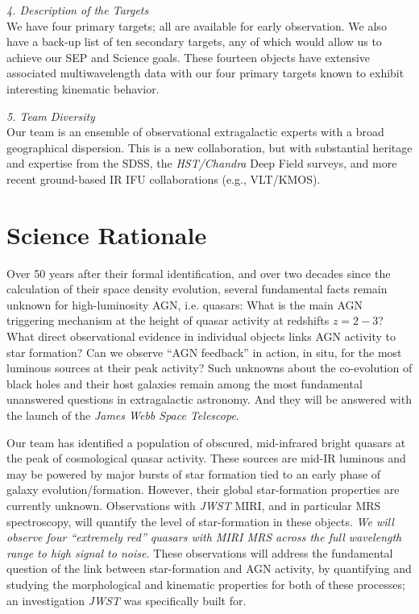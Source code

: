 \smallskip 
\smallskip \smallskip
\noindent
{\it 4. Description of the Targets}\\
We have four primary targets; all are available for early observation.
We also have a back-up list of ten secondary targets, any of which
would allow us to achieve our SEP and Science goals. These fourteen
objects have extensive associated multiwavelength data with our four
primary targets known to exhibit interesting kinematic behavior.

\smallskip 
\smallskip \smallskip
\noindent
{\it 5. Team Diversity}\\
Our team is an ensemble of observational extragalactic experts with a
broad geographical dispersion. This is a new collaboration, but with
substantial heritage and expertise from the SDSS, the {\it
HST/Chandra} Deep Field surveys, and more recent ground-based IR IFU
collaborations (e.g., VLT/KMOS).  


\section*{Science Rationale}
\vspace{-6pt}
\noindent
Over 50 years after their formal identification, and over two decades
since the calculation of their space density evolution, several
fundamental facts remain unknown for high-luminosity AGN,
i.e. quasars: What is the main AGN triggering mechanism at the height
of quasar activity at redshifts $z=2-3$? What direct observational
evidence in individual objects links AGN activity to star formation?
Can we observe ``AGN feedback'' in action, in situ, for the most
luminous sources at their peak activity?  Such unknowns about the
co-evolution of black holes and their host galaxies remain among the
most fundamental unanswered questions in extragalactic astronomy.  And
they will be answered with the launch of the {\it James Webb Space
Telescope}.

\smallskip \smallskip
\noindent
Our team has identified a population of obscured, mid-infrared bright
quasars at the peak of cosmological quasar activity.  These sources
are mid-IR luminous and may be powered by major bursts of star
formation tied to an early phase of galaxy
evolution/formation. However, their global star-formation properties
are currently unknown.  Observations with {\it JWST} MIRI, and in
particular MRS spectroscopy, will quantify the level of star-formation
in these objects.  {\it We will observe four ``extremely red'' quasars
with MIRI MRS across the full wavelength range to high signal to
noise.} These observations will address the fundamental question of
the link between star-formation and AGN activity, by quantifying and
studying the morphological and kinematic properties for both of these
processes; an investigation {\it JWST} was specifically built for.

